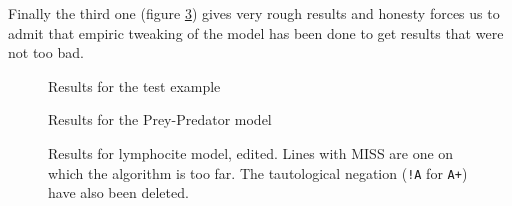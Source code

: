 \documentclass[fontsize=9pt,enabledeprecatedfontcommands]{scrartcl}
\begin{document}
Finally the third one (figure \ref{lympho_res}) gives very rough results and honesty forces us to admit that empiric tweaking of the model has been done to get results that were not too bad.

\begin{figure}
	
	\caption{Results for the test example \label{test_res}}
\end{figure}
\begin{figure}
	
	\caption{Results for the Prey-Predator model\label{preypred_res}}
\end{figure}
\begin{figure}
	
	\caption{Results for lymphocite model, edited. Lines with MISS are one on which the algorithm is too far. The tautological negation (\texttt{!A} for \texttt{A+}) have also been deleted.\label{lympho_res}}
\end{figure}




\end{document}
